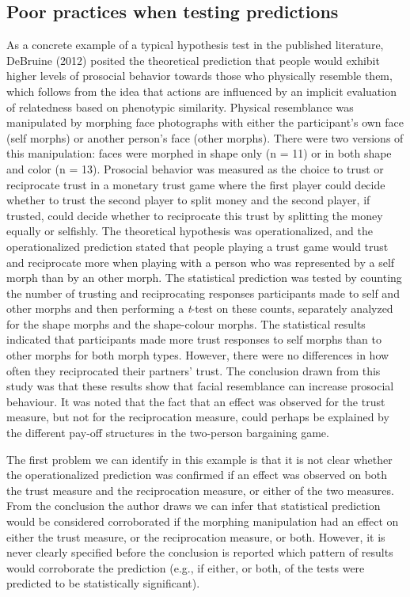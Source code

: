 \documentclass[doc,floatsintext]{apa6}
\begin{document}
\hypertarget{poor-practices-when-testing-predictions}{%
\subsection{Poor practices when testing predictions}\label{poor-practices-when-testing-predictions}}

As a concrete example of a typical hypothesis test in the published literature, DeBruine (2012) posited the theoretical prediction that people would exhibit higher levels of prosocial behavior towards those who physically resemble them, which follows from the idea that actions are influenced by an implicit evaluation of relatedness based on phenotypic similarity. Physical resemblance was manipulated by morphing face photographs with either the participant's own face (self morphs) or another person's face (other morphs). There were two versions of this manipulation: faces were morphed in shape only (n = 11) or in both shape and color (n = 13). Prosocial behavior was measured as the choice to trust or reciprocate trust in a monetary trust game where the first player could decide whether to trust the second player to split money and the second player, if trusted, could decide whether to reciprocate this trust by splitting the money equally or selfishly. The theoretical hypothesis was operationalized, and the operationalized prediction stated that people playing a trust game would trust and reciprocate more when playing with a person who was represented by a self morph than by an other morph. The statistical prediction was tested by counting the number of trusting and reciprocating responses participants made to self and other morphs and then performing a \emph{t}-test on these counts, separately analyzed for the shape morphs and the shape-colour morphs. The statistical results indicated that participants made more trust responses to self morphs than to other morphs for both morph types. However, there were no differences in how often they reciprocated their partners' trust. The conclusion drawn from this study was that these results show that facial resemblance can increase prosocial behaviour. It was noted that the fact that an effect was observed for the trust measure, but not for the reciprocation measure, could perhaps be explained by the different pay-off structures in the two-person bargaining game.

The first problem we can identify in this example is that it is not clear whether the operationalized prediction was confirmed if an effect was observed on both the trust measure and the reciprocation measure, or either of the two measures. From the conclusion the author draws we can infer that statistical prediction would be considered corroborated if the morphing manipulation had an effect on either the trust measure, or the reciprocation measure, or both. However, it is never clearly specified before the conclusion is reported which pattern of results would corroborate the prediction (e.g., if either, or both, of the tests were predicted to be statistically significant).
\end{document}
